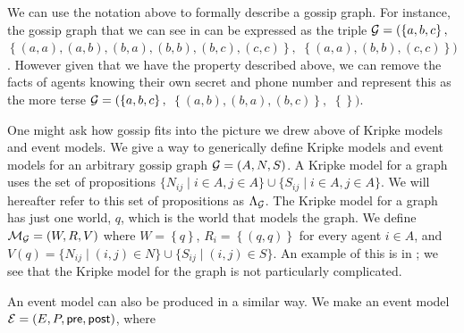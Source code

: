 \documentclass[10pt, a4paper]{report}
\begin{document}
We can use the notation above to formally describe a gossip graph. For instance,
the gossip graph that we can see in  can be expressed as
the triple $\mathcal{G} = (\left\{ a, b, c \right\},$ $ \left\{ (a, a), (a, b), (b,
  a), (b, b), (b, c), (c, c) \right\},$ $ \left\{ (a, a), (b, b), (c, c)
\right\})$. However given that we have the property described above, we can
remove the facts of agents knowing their own secret and phone number and
represent this as the more terse $\mathcal{G} = (\left\{ a, b, c \right\},$ $ \left\{
  (a, b), (b, a), (b, c) \right\}, $ $ \left\{ \right\})$.

One might ask how gossip fits into the picture we drew above of Kripke models
and event models. We give a way to generically define Kripke models and event
models for an arbitrary gossip graph $\mathcal{G} = (A, N, S)$. A Kripke model for a
graph  uses the set of propositions $\{N_{ij} \mid i \in A, j \in A\}
\cup \{S_{ij} \mid i \in A, j \in A\}$. We will hereafter refer to this set of
propositions as $\Lambda_{\mathcal{G}}$. The Kripke model for a graph  has
just one world, $q$, which is the world that models the graph. We define
$\mathcal{M_G} = (W, R, V)$ where $W = \left\{ q \right\}$, $R_i = \left\{ (q, q)
\right\}$ for every agent $i \in A$, and $V(q) = \{N _{ij} \mid (i, j) \in N\}
\cup \{S_{ij} \mid (i, j) \in S\}$. An example of this is in
; we see that the Kripke model for the graph is not
particularly complicated. 

An event model can also be produced in a similar way. We make an event model
$\mathcal{E} = (E, P, \textsf{pre}, \textsf{post})$, where
\end{document}
